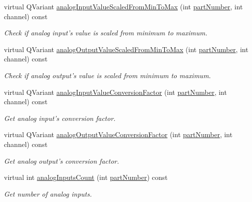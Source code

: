 \begin{DoxyCompactItemize}
virtual Q\-Variant \hyperlink{classmdt_device_modbus_wago_module_acabe25371f651f5f224abf89277be5f8}{analog\-Input\-Value\-Scaled\-From\-Min\-To\-Max} (int \hyperlink{classmdt_device_modbus_wago_module_ab694800ebccf308beb9eeb9a789b0442}{part\-Number}, int channel) const 
\begin{DoxyCompactList}\small\item\em Check if analog input's value is scaled from minimum to maximum. \end{DoxyCompactList}\item 
virtual Q\-Variant \hyperlink{classmdt_device_modbus_wago_module_af2af1897221c28d03424c387f247e139}{analog\-Output\-Value\-Scaled\-From\-Min\-To\-Max} (int \hyperlink{classmdt_device_modbus_wago_module_ab694800ebccf308beb9eeb9a789b0442}{part\-Number}, int channel) const 
\begin{DoxyCompactList}\small\item\em Check if analog output's value is scaled from minimum to maximum. \end{DoxyCompactList}\item 
virtual Q\-Variant \hyperlink{classmdt_device_modbus_wago_module_a3567f225c332d4ce7dcc3cb724b8ad1f}{analog\-Input\-Value\-Conversion\-Factor} (int \hyperlink{classmdt_device_modbus_wago_module_ab694800ebccf308beb9eeb9a789b0442}{part\-Number}, int channel) const 
\begin{DoxyCompactList}\small\item\em Get analog input's conversion factor. \end{DoxyCompactList}\item 
virtual Q\-Variant \hyperlink{classmdt_device_modbus_wago_module_a8ce8e6ddebbf16db6bc2edbb7ef5d786}{analog\-Output\-Value\-Conversion\-Factor} (int \hyperlink{classmdt_device_modbus_wago_module_ab694800ebccf308beb9eeb9a789b0442}{part\-Number}, int channel) const 
\begin{DoxyCompactList}\small\item\em Get analog output's conversion factor. \end{DoxyCompactList}\item 
virtual int \hyperlink{classmdt_device_modbus_wago_module_a67b7c04870074112f45e99d8aa12879a}{analog\-Inputs\-Count} (int \hyperlink{classmdt_device_modbus_wago_module_ab694800ebccf308beb9eeb9a789b0442}{part\-Number}) const 
\begin{DoxyCompactList}\small\item\em Get number of analog inputs. \end{DoxyCompactList}\item 

\end{DoxyCompactItemize}
